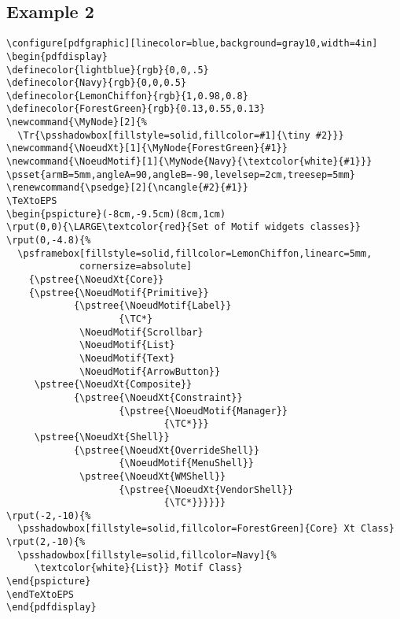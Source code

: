 \documentclass{ltxguide}
\begin{document}
\subsection{Example 2}
\begin{verbatim}
\configure[pdfgraphic][linecolor=blue,background=gray10,width=4in]
\begin{pdfdisplay}
\definecolor{lightblue}{rgb}{0,0,.5}
\definecolor{Navy}{rgb}{0,0,0.5}
\definecolor{LemonChiffon}{rgb}{1,0.98,0.8}
\definecolor{ForestGreen}{rgb}{0.13,0.55,0.13}
\newcommand{\MyNode}[2]{%
  \Tr{\psshadowbox[fillstyle=solid,fillcolor=#1]{\tiny #2}}}
\newcommand{\NoeudXt}[1]{\MyNode{ForestGreen}{#1}}
\newcommand{\NoeudMotif}[1]{\MyNode{Navy}{\textcolor{white}{#1}}}
\psset{armB=5mm,angleA=90,angleB=-90,levelsep=2cm,treesep=5mm}
\renewcommand{\psedge}[2]{\ncangle{#2}{#1}}
\TeXtoEPS
\begin{pspicture}(-8cm,-9.5cm)(8cm,1cm)
\rput(0,0){\LARGE\textcolor{red}{Set of Motif widgets classes}}
\rput(0,-4.8){%
  \psframebox[fillstyle=solid,fillcolor=LemonChiffon,linearc=5mm,
             cornersize=absolute]
    {\pstree{\NoeudXt{Core}}
    {\pstree{\NoeudMotif{Primitive}}
            {\pstree{\NoeudMotif{Label}}
                    {\TC*}
             \NoeudMotif{Scrollbar}
             \NoeudMotif{List}
             \NoeudMotif{Text}
             \NoeudMotif{ArrowButton}}
     \pstree{\NoeudXt{Composite}}
            {\pstree{\NoeudXt{Constraint}}
                    {\pstree{\NoeudMotif{Manager}}
                            {\TC*}}}
     \pstree{\NoeudXt{Shell}}
            {\pstree{\NoeudXt{OverrideShell}}
                    {\NoeudMotif{MenuShell}}
             \pstree{\NoeudXt{WMShell}}
                    {\pstree{\NoeudXt{VendorShell}}
                            {\TC*}}}}}}
\rput(-2,-10){%
  \psshadowbox[fillstyle=solid,fillcolor=ForestGreen]{Core} Xt Class}
\rput(2,-10){%
  \psshadowbox[fillstyle=solid,fillcolor=Navy]{%
     \textcolor{white}{List}} Motif Class}
\end{pspicture}
\endTeXtoEPS
\end{pdfdisplay}
\end{verbatim}
\configure[pdfgraphic][linecolor=blue,
                       linewidth=2pt, rulesep=6pt,
                       background=gray10,scale=.8]
\end{document}
